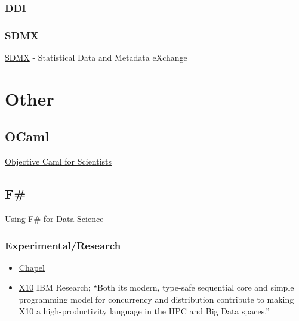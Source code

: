 \subsection{DDI}
\label{subsect:ddi}

\subsection{SDMX}
\label{subsect:sdmx}

\href{http://sdmx.org/}{SDMX} - Statistical Data and Metadata eXchange

\chapter{Other}

\section{OCaml}
\label{sect:ocaml}

\href{http://www.ffconsultancy.com/products/ocaml_for_scientists/chapter1.html}{Objective Caml for Scientists}

\section{F\#}
\label{sect:fsharp}

\href{http://fsharp.org/data-science/}{Using F\# for Data Science}

\subsection{Experimental/Research}
\label{subs:expersch}

\begin{itemize}
\item \href{http://chapel.cray.com/overview.html}{Chapel}
\item \href{http://x10-lang.org/}{X10} IBM Research; ``Both its modern, type-safe sequential core and simple programming model for concurrency and distribution contribute to making X10 a high-productivity language in the HPC and Big Data spaces.''
\end{itemize}

